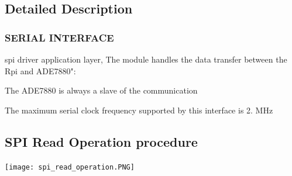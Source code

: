 \subsection{Detailed Description}






 \hypertarget{file2}{}\subsubsection{S\-E\-R\-I\-A\-L I\-N\-T\-E\-R\-F\-A\-C\-E}\label{file2}
spi driver application layer, The module handles the data transfer between the Rpi and A\-D\-E7880"\-:

\begin{DoxyItemize}
\item The A\-D\-E7880 is always a slave of the communication\end{DoxyItemize}
\begin{DoxyItemize}
\item The maximum serial clock frequency supported by this interface is 2. M\-Hz \par
\par
\par
\end{DoxyItemize}
\hypertarget{de/d5e/a00007_READ}{}\subsection{S\-P\-I Read Operation procedure}\label{de/d5e/a00007_READ}
 
\begin{DoxyImageNoCaption}
  \mbox{\texttt{[image: spi\_read\_operation.PNG]}}
\end{DoxyImageNoCaption}


